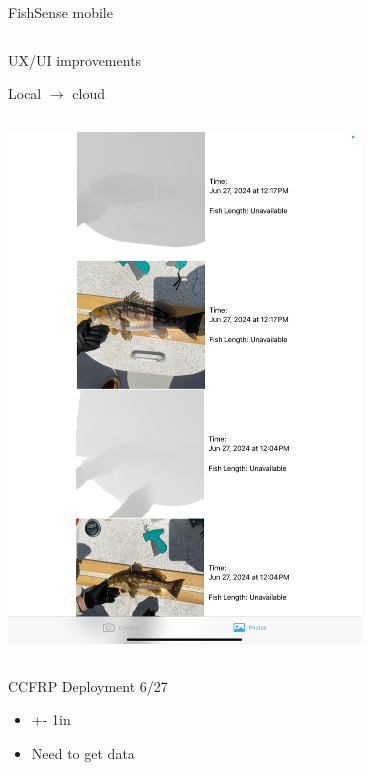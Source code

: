 \begin{frame}{FishSense mobile}
    \begin{column}{0.5\textwidth}
        \item UX/UI improvements
        \item Local $\rightarrow$ cloud
    \end{column}
    \begin{column}{0.5\textwidth}
        \centering
        \includegraphics[height=0.7\textheight,width=0.7\textwidth,keepaspectratio]{images/fs_app.png}
    \end{column}
\end{frame}

\begin{frame}{CCFRP Deployment 6/27}
    \begin{itemize}
        \item +- 1in
        \item Need to get data
    \end{itemize}
\end{frame}


